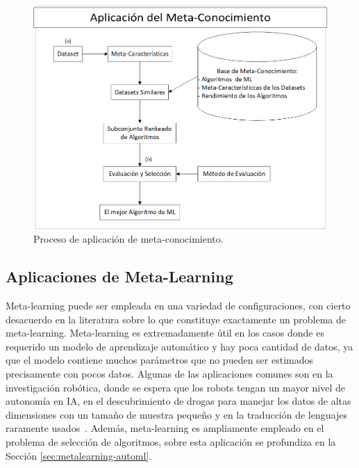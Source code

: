 \begin{figure}[H]
	\centering
	\includegraphics[scale=.5]{Figures/application.png}
	\caption{Proceso de aplicación de meta-conocimiento. %
		}
	\label{fig:application}
\end{figure}

\subsection{Aplicaciones de Meta-Learning}\label{subsec:mtl_aplications}

Meta-learning puede ser empleada en una variedad de configuraciones, con cierto desacuerdo en la literatura sobre lo que constituye exactamente un problema de meta-learning. Meta-learning es extremadamente útil en los casos donde es requerido un modelo de aprendizaje automático y hay poca cantidad de datos, ya que el modelo contiene muchos parámetros que no pueden ser estimados precisamente con pocos datos. Algunas de las aplicaciones comunes son en la investigación robótica, donde se espera que los robots tengan un mayor nivel de autonomía en IA, en el descubrimiento de drogas para manejar los datos de altas dimensiones con un tamaño de muestra pequeño y en la traducción de lenguajes raramente usados~\cite{peng2020comprehensive}. Además, meta-learning es ampliamente empleado en el problema de selección de algoritmos, sobre esta aplicación se profundiza en la Sección \ref{sec:metalearning-automl}.

